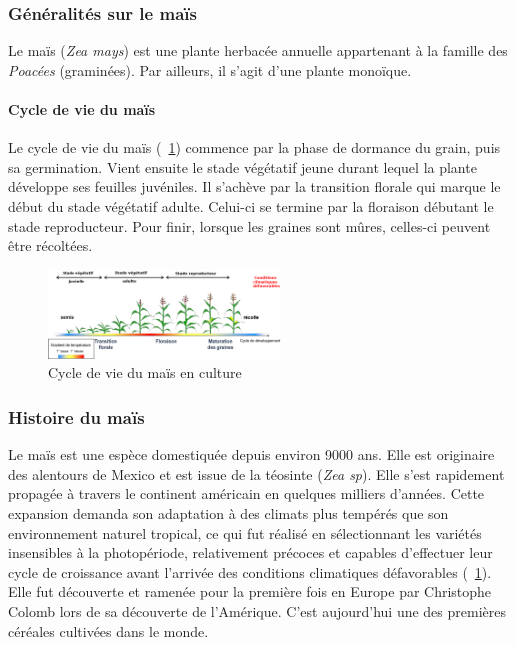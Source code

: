 \documentclass[12pt,a4paper]{article}
\begin{document}
					\subsubsection{Généralités sur le maïs}
						Le maïs (\textit{Zea mays}) est une plante herbacée annuelle appartenant à la famille des \emph{Poacées} (graminées). Par ailleurs, il s'agit d'une plante monoïque.
						
						\paragraph{Cycle de vie du maïs}
						Le cycle de vie du maïs (~\ref{Cycle de vie du maïs en culture}) commence par la phase de dormance du grain, puis sa germination. Vient ensuite le stade végétatif jeune durant lequel la plante développe ses feuilles juvéniles. Il s'achève par la transition florale qui marque le début du stade végétatif adulte. Celui-ci se termine par la floraison débutant le stade reproducteur. Pour finir, lorsque les graines sont mûres, celles-ci peuvent être récoltées.
						\begin{figure}[h]
							\centering
							\includegraphics[width=0.55\textwidth]{cycle.png}
							\caption{Cycle de vie du maïs en culture}
							\label{Cycle de vie du maïs en culture}
						\end{figure}
							
					
					\subsubsection{Histoire du maïs}
						Le maïs est une espèce domestiquée depuis environ 9000 ans. Elle est originaire des alentours de Mexico et est issue de la téosinte (\textit{Zea sp}). Elle s'est rapidement propagée à travers le continent américain\cite{tenaillon} en quelques milliers d'années. Cette expansion demanda son adaptation à des climats plus tempérés que son environnement naturel tropical, ce qui fut réalisé en sélectionnant les variétés insensibles à la photopériode, relativement précoces et capables d'effectuer leur cycle de croissance avant l'arrivée des conditions climatiques défavorables (~\ref{Cycle de vie du maïs en culture}). Elle fut découverte et ramenée pour la première fois en Europe par Christophe Colomb lors de sa découverte de l'Amérique. C'est aujourd'hui une des premières céréales cultivées dans le monde.
						
\end{document}
